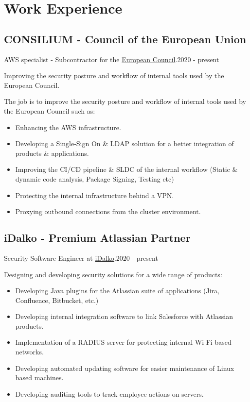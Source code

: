 \section{Work Experie\textcolor{mycolor}{nce}}
  \subsection{CONSILIUM - Council of the European Union }
    AWS specialist - Subcontractor for the {\href{https://www.consilium.europa.eu/en/european-council/}{European Council}}.{\textcolor{mygrey}{\hspace*{\fill}2020 - present}}

    Improving the security posture and workflow of internal tools used by the European Council.

    The job is to improve the security posture and workflow of internal tools used by the European Council such as:
    \begin{itemize}
      \item Enhancing the AWS infrastructure.
      \item Developing a Single-Sign On \& LDAP solution for a better integration of products \& applications.
      \item Improving the CI/CD pipeline \& SLDC of the internal workflow (Static \& dynamic code analysis, Package Signing, Testing etc)
      \item Protecting the internal infrastructure behind a VPN.
      \item Proxying outbound connections from the cluster environment.
    \end{itemize}
  \subsection{iDalko - Premium Atlassian Partner}
    Security Software Engineer at {\href{https://www.idalko.com}{iDalko}}.{\textcolor{mygrey}{\hspace*{\fill}2020 - present}}

    Designing and developing security solutions for a wide range of products:

    \begin{itemize}
      \item Developing Java plugins for the Atlassian suite of applications (Jira, Confluence, Bitbucket, etc.)
      \item Developing internal integration software to link Salesforce with Atlassian products.
      \item Implementation of a RADIUS server for protecting internal Wi-Fi based networks.
      \item Developing automated updating software for easier maintenance of Linux based machines.
      \item Developing auditing tools to track employee actions on servers.
    \end{itemize}
